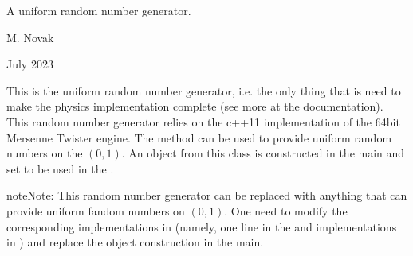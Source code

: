\documentclass[letterpaper,10pt,english]{sphinxmanual}
\begin{document}
\begin{fulllineitems}
\label{\detokenize{Simulation/SimulationCodeDoc:_CPPv47URandom}}
\pysigstartsignatures
\pysigstartmultiline
{}
\pysigstopmultiline
\pysigstopsignatures
\sphinxAtStartPar
A uniform random number generator. 

\sphinxAtStartPar
\begin{description}
\sphinxAtStartPar
M. Novak 

\sphinxAtStartPar
July 2023

\end{description}


\sphinxAtStartPar
This is the uniform random number generator, i.e. the only thing that is need to make the  physics implementation complete (see more at the  documentation). This random number generator relies on the c++11 implementation of the 64\sphinxhyphen{}bit Mersenne Twister engine. The  method can be used to provide uniform random numbers on the \((0,1)\). An object from this class is constructed in the  main and set to be used in the .

\sphinxAtStartPar

\begin{sphinxadmonition}{note}{Note:}
\sphinxAtStartPar
This random number generator can be replaced with anything that can provide uniform fandom numbers on \((0,1)\). One need to modify the corresponding implementations in  (namely, one line in the  and  implementations in ) and replace the  object construction in the  main. 
\end{sphinxadmonition}



\end{fulllineitems}
\end{document}
